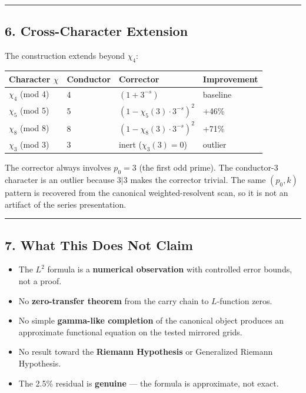 \documentclass[
  11pt,
]{article}
\providecommand{\tightlist}{%
  \setlength{\itemsep}{0pt}\setlength{\parskip}{0pt}}
\begin{document}
\begin{center}\rule{0.5\linewidth}{0.5pt}\end{center}

\newpage

\subsection{6. Cross-Character Extension}\label{cross-character-extension}

The construction extends beyond \(\chi_4\):

\begin{longtable}[]{@{}llll@{}}
\toprule\noalign{}
Character \(\chi\) & Conductor & Corrector & Improvement \\
\midrule\noalign{}
\endhead
\bottomrule\noalign{}
\endlastfoot
\(\chi_4\) (mod 4) & 4 & \((1 + 3^{-s})\) & baseline \\
\(\chi_5\) (mod 5) & 5 & \((1 - \chi_5(3) \cdot 3^{-s})^2\) & +46\% \\
\(\chi_8\) (mod 8) & 8 & \((1 - \chi_8(3) \cdot 3^{-s})^2\) & +71\% \\
\(\chi_3\) (mod 3) & 3 & inert (\(\chi_3(3) = 0\)) & outlier \\
\end{longtable}

The corrector always involves \(p_0 = 3\) (the first odd prime). The conductor-3
character is an outlier because \(3 | 3\) makes the corrector trivial. The same
\((p_0,k)\) pattern is recovered from the canonical weighted-resolvent scan, so
it is not an artifact of the series presentation.

\begin{center}\rule{0.5\linewidth}{0.5pt}\end{center}

\newpage

\subsection{7. What This Does Not Claim}\label{what-this-does-not-claim}

\begin{itemize}
\tightlist
\item
  The \(L^2\) formula is a \textbf{numerical observation} with controlled error
  bounds, not a proof.
\item
  No \textbf{zero-transfer theorem} from the carry chain to \(L\)-function
  zeros.
\item
  No simple \textbf{gamma-like completion} of the canonical object produces an
  approximate functional equation on the tested mirrored grids.
\item
  No result toward the \textbf{Riemann Hypothesis} or Generalized Riemann
  Hypothesis.
\item
  The 2.5\% residual is \textbf{genuine} --- the formula is approximate, not
  exact.
\end{itemize}
\end{document}
